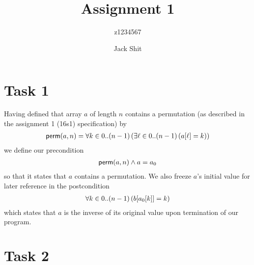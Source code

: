 \documentclass[a4paper,12pt,fleqn]{scrartcl}
\title{Assignment 1}
\author{z1234567\and Jack Shit}
\newcommand{\remark}[1]{{\sffamily\color{blue}{#1}}}
\newcommand{\perm}{\mathsf{perm}}
\begin{document}
  \maketitle
  
  \remark{I've sprinkled a few explanatory remarks in here, typeset like
    this one. You wouldn't do that to Liam. Instead you'd fill in all
    the gaps.}
  
  \section{Task 1}
  \label{sec:task-1}
  Having defined that array $a$ of length $n$ contains a permutation (as
  described in the assignment 1 (16s1) specification) by
  \begin{gather*}
    \perm(a,n) = \All{k\in 0..(n-1)}{\Exi{\ell\in 0..(n-1)}{a[\ell]=k}}
  \end{gather*}
  we define our precondition
  \begin{gather*}
    \perm(a,n)\And a=a_0
  \end{gather*}
  so that it states that $a$ contains a permutation. We also freeze
  $a$'s initial value for later reference in the postcondition
  \begin{gather*}
    \forall k\in0..(n-1)\left(b[a_0[k]]=k\right)
  \end{gather*}
  which states that $a$ is the inverse of its original value upon
  termination of our program.
  
  \section{Task 2}
  \label{sec:task-2}
  
\end{document}
